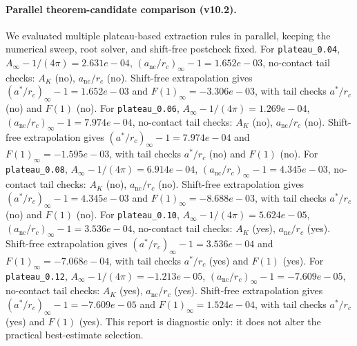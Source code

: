 \paragraph{Parallel theorem-candidate comparison (v10.2).}
We evaluated multiple plateau-based extraction rules in parallel, keeping the numerical sweep, root solver, and shift-free postcheck fixed. For \texttt{plateau_0.04}, $A_\infty-1/(4\pi)=2.631e-04$, $(a_{\mathrm{nc}}/r_c)_\infty-1=1.652e-03$, no-contact tail checks: $A_K$ (no), $a_{\mathrm{nc}}/r_c$ (no). Shift-free extrapolation gives $(a^*/r_c)_\infty-1=1.652e-03$ and $F(1)_\infty=-3.306e-03$, with tail checks $a^*/r_c$ (no) and $F(1)$ (no). For \texttt{plateau_0.06}, $A_\infty-1/(4\pi)=1.269e-04$, $(a_{\mathrm{nc}}/r_c)_\infty-1=7.974e-04$, no-contact tail checks: $A_K$ (no), $a_{\mathrm{nc}}/r_c$ (no). Shift-free extrapolation gives $(a^*/r_c)_\infty-1=7.974e-04$ and $F(1)_\infty=-1.595e-03$, with tail checks $a^*/r_c$ (no) and $F(1)$ (no). For \texttt{plateau_0.08}, $A_\infty-1/(4\pi)=6.914e-04$, $(a_{\mathrm{nc}}/r_c)_\infty-1=4.345e-03$, no-contact tail checks: $A_K$ (no), $a_{\mathrm{nc}}/r_c$ (no). Shift-free extrapolation gives $(a^*/r_c)_\infty-1=4.345e-03$ and $F(1)_\infty=-8.688e-03$, with tail checks $a^*/r_c$ (no) and $F(1)$ (no). For \texttt{plateau_0.10}, $A_\infty-1/(4\pi)=5.624e-05$, $(a_{\mathrm{nc}}/r_c)_\infty-1=3.536e-04$, no-contact tail checks: $A_K$ (yes), $a_{\mathrm{nc}}/r_c$ (yes). Shift-free extrapolation gives $(a^*/r_c)_\infty-1=3.536e-04$ and $F(1)_\infty=-7.068e-04$, with tail checks $a^*/r_c$ (yes) and $F(1)$ (yes). For \texttt{plateau_0.12}, $A_\infty-1/(4\pi)=-1.213e-05$, $(a_{\mathrm{nc}}/r_c)_\infty-1=-7.609e-05$, no-contact tail checks: $A_K$ (yes), $a_{\mathrm{nc}}/r_c$ (yes). Shift-free extrapolation gives $(a^*/r_c)_\infty-1=-7.609e-05$ and $F(1)_\infty=1.524e-04$, with tail checks $a^*/r_c$ (yes) and $F(1)$ (yes). This report is diagnostic only: it does not alter the practical best-estimate selection.
